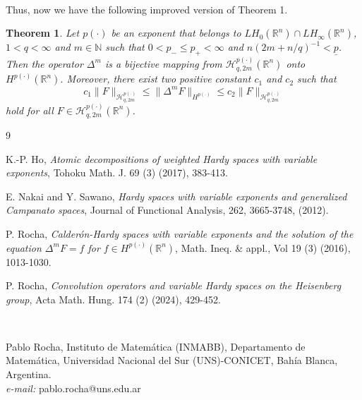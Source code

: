 \documentclass[oneside,10pt]{article}
\newtheorem{theorem}{Theorem}
\begin{document}
\

Thus, now we have the following improved version of Theorem 1.

\begin{theorem} Let $p(\cdot)$ be an exponent that belongs to $LH_{0}(\mathbb{R}^{n})\cap LH_{\infty}(\mathbb{R}^{n})$, 
$1 < q < \infty$ and $m \in \mathbb{N}$ such that $0 < p_{-} \leq p_{+} < \infty$ and $n (2m + n/q)^{-1} < \underline{p}$. Then 
the operator $\Delta^{m}$ is a bijective mapping from $\mathcal{H}^{p(\cdot)}_{q, 2m}(\mathbb{R}^{n})$ onto 
$H^{p(\cdot)}(\mathbb{R}^{n})$. Moreover, there exist two positive constant $c_1$ and $c_2$ such that
\[
c_1 \|F \|_{\mathcal{H}^{p(\cdot)}_{q, 2m}} \leq \| \Delta^{m}F \|_{H^{p(\cdot)}} \leq c_2 \|F \|_{\mathcal{H}^{p(\cdot)}_{q, 2m}}
\]
hold for all $F \in \mathcal{H}^{p(\cdot)}_{q, 2m}(\mathbb{R}^{n})$.
\end{theorem}

\begin{thebibliography}{9}

 {\sc K.-P. Ho}, \textit{Atomic decompositions of weighted Hardy spaces with variable exponents}, Tohoku Math. J. 69 (3) 
(2017), 383-413.

 {\sc E. Nakai and Y. Sawano}, \textit{Hardy spaces with variable exponents and generalized
Campanato spaces}, Journal of Functional Analysis, 262, 3665-3748, (2012).

 {\sc P. Rocha}, \textit{Calder\'on-Hardy spaces with variable exponents and the solution of the equation $\Delta^{m}F=f$ for
$f \in H^{p(\cdot)}(\mathbb{R}^{n})$}, Math. Ineq. \& appl., Vol 19 (3) (2016), 1013-1030.

 {\sc P. Rocha}, \textit{Convolution operators and variable Hardy spaces on the Heisenberg group}, Acta Math. Hung. 174 (2) 
(2024), 429-452.

\end{thebibliography}

\

Pablo Rocha, Instituto de Matem\'atica (INMABB), Departamento de Matem\'atica, Universidad Nacional del Sur (UNS)-CONICET, Bah\'ia Blanca, Argentina. \\
{\it e-mail:} pablo.rocha@uns.edu.ar
\end{document}
